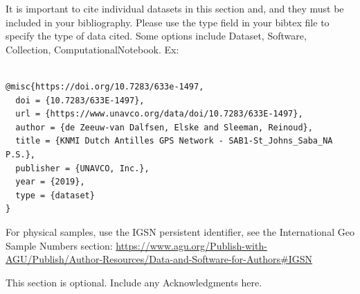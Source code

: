 \documentclass[draft]{agujournal2019}
\begin{document}
It is important to cite individual datasets in this section and, and they must be included in your bibliography. Please use the type field in your bibtex file to specify the type of data cited. Some options include Dataset, Software, Collection, ComputationalNotebook. Ex: 
\\
\begin{verbatim}

@misc{https://doi.org/10.7283/633e-1497,
  doi = {10.7283/633E-1497},
  url = {https://www.unavco.org/data/doi/10.7283/633E-1497},
  author = {de Zeeuw-van Dalfsen, Elske and Sleeman, Reinoud},
  title = {KNMI Dutch Antilles GPS Network - SAB1-St_Johns_Saba_NA P.S.},
  publisher = {UNAVCO, Inc.},
  year = {2019},
  type = {dataset}
}

\end{verbatim}

For physical samples, use the IGSN persistent identifier, see the International Geo Sample Numbers section:
\url{https://www.agu.org/Publish-with-AGU/Publish/Author-Resources/Data-and-Software-for-Authors#IGSN}

\acknowledgments
This section is optional. Include any Acknowledgments here.




%
%







%
%
%
%
%
\end{document}
